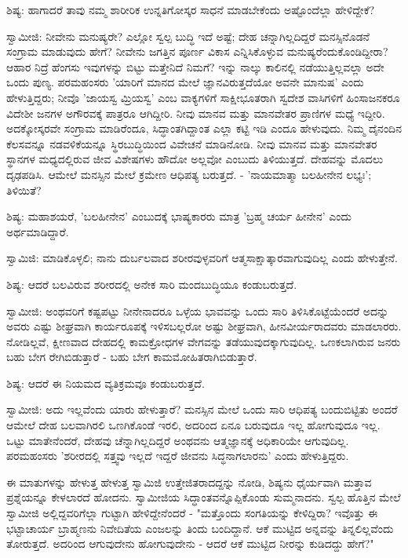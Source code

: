 ಶಿಷ್ಯ: ಹಾಗಾದರೆ ತಾವು ನಮ್ಮ ಶಾರೀರಿಕ ಉನ್ನತಿಗೋಸ್ಕರ ಸಾಧನೆ ಮಾಡಬೇಕೆಂದು ಅಷ್ಟೊಂದೆಲ್ಲಾ ಹೇಳಿದ್ದೇಕೆ?

ಸ್ವಾಮೀಜಿ: ನೀವೇನು ಮನುಷ್ಯರೇ? ಎಲ್ಲೋ ಸ್ವಲ್ಪ ಬುದ್ಧಿ ಇದೆ ಅಷ್ಟೆ; ದೇಹ ಚನ್ನಾಗಿಲ್ಲದಿದ್ದರೆ ಮನಸ್ಸಿನೊಡನೆ ಸಂಗ್ರಾಮ ಮಾಡುವುದು ಹೇಗೆ? ನೀವೇನು ಜಗತ್ತಿನ ಪೂರ್ಣ ವಿಕಾಸ ಎನ್ನಿಸಿಕೊಳ್ಳುವ ಮನುಷ್ಯರೆಂದುಕೊಂಡಿದ್ದೀರಾ? ಆಹಾರ ನಿದ್ರೆ ಹೆಂಗಸು ಇವುಗಳನ್ನು ಬಿಟ್ಟು ಮತ್ತೇನಿದೆ ನಿಮಗೆ? ಇನ್ನು ನಾಲ್ಕು ಕಾಲಿನಲ್ಲಿ ನಡೆಯುತ್ತಿಲ್ಲವಲ್ಲಾ ಅದೇ ಒಂದು ಪುಣ್ಯ. ಪರಮಹಂಸರು 'ಯಾರಿಗೆ ಮಾನದ ಮೇಲೆ ಜ್ಞಾನವಿರುತ್ತದೆಯೋ ಅವನೇ ಮಾನುಷ' ಎಂದು ಹೇಳುತ್ತಿದ್ದರು; ನೀವೊ 'ಜಾಯಸ್ವ ಮ್ರಿಯಸ್ವ' ಎಂಬ ವಾಕ್ಯಗಳಿಗೆ ಸಾಕ್ಷೀಭೂತರಾಗಿ ಸ್ವದೇಶ ವಾಸಿಗಳಿಗೆ ಹಿಂಸಾಜನಕರೂ ವಿದೇಶೀ ಜನಗಳ ಅಗೌರವಕ್ಕೆ ಪಾತ್ರರೂ ಆಗಿದ್ದೀರಿ. ನೀವು ಮಾನವ ಮತ್ತು ಮಾನವೇತರ ಪ್ರಾಣಿಗಳ ಮಧ್ಯೆ ಇದ್ದೀರಿ. ಅದಕ್ಕೋಸ್ಕರವೇ ಸಂಗ್ರಾಮ ಮಾಡಿರೆಂದೂ, ಸಿದ್ಧಾಂತಗಿದ್ದಾಂತ ಎಲ್ಲಾ ಕಟ್ಟಿ ಇಡಿ ಎಂದೂ ಹೇಳುವುದು. ನಿಮ್ಮ ದೈನಂದಿನ ಕೆಲಸವನ್ನೂ ನಡವಳಿಕೆಯನ್ನೂ ಸ್ಥಿರಬುದ್ಧಿಯಿಂದ ವಿವೇಚನೆ ಮಾಡಿನೋಡಿ. ನೀವು ಮಾನವ ಮತ್ತು ಮಾನವೇತರ ಸ್ಥಾನಗಳ ಮಧ್ಯದಲ್ಲಿರುವ ಜೀವ ವಿಶೇಷಗಳು ಹೌದೋ ಅಲ್ಲವೋ ಎಂಬುದು ತಿಳಿಯುತ್ತದೆ. ದೇಹವನ್ನು ಮೊದಲು ದೃಢಪಡಿಸಿ. ಆಮೇಲೆ ಮನಸ್ಸಿನ ಮೇಲೆ ಕ್ರಮೇಣ ಆಧಿಪತ್ಯ ಬರುತ್ತದೆ. - 'ನಾಯಮಾತ್ಮಾ ಬಲಹೀನೇನ ಲಭ್ಯಃ'; ತಿಳಿಯಿತೆ?

ಶಿಷ್ಯ: ಮಹಾಶಯರೆ, 'ಬಲಹೀನೇನ' ಎಂಬುದಕ್ಕೆ ಭಾಷ್ಯಕಾರರು ಮಾತ್ರ 'ಬ್ರಹ್ಮ ಚರ್ಯ ಹೀನೇನ' ಎಂದು ಅರ್ಥಮಾಡಿದ್ದಾರೆ.

ಸ್ವಾಮಿಜಿ: ಮಾಡಿಕೊಳ್ಳಲಿ; ನಾನು ದುರ್ಬಲವಾದ ಶರೀರವುಳ್ಳವರಿಗೆ ಆತ್ಮಸಾಕ್ಷಾತ್ಕಾರವಾಗುವುದಿಲ್ಲ ಎಂದು ಹೇಳುತ್ತೇನೆ.

ಶಿಷ್ಯ: ಆದರೆ ಬಲವಿರುವ ಶರೀರದಲ್ಲಿ ಅನೇಕ ಸಾರಿ ಮಂದಬುದ್ಧಿಯೂ ಕಂಡುಬರುತ್ತದೆ.

ಸ್ವಾಮೀಜಿ: ಅಂಥವರಿಗೆ ಕಷ್ಟಪಟ್ಟು ನೀನೇನಾದರೂ ಒಳ್ಳೆಯ ಭಾವವನ್ನು ಒಂದು ಸಾರಿ ತಿಳಿಸಿಕೊಟ್ಟೆಯೆಂದರೆ ಅದನ್ನು ಅವರು ಎಷ್ಟು ಶೀಘ್ರವಾಗಿ ಕಾರ್ಯರೂಪಕ್ಕೆ ಇಳಿಸಬಲ್ಲರೋ ಅಷ್ಟು ಶೀಘ್ರವಾಗಿ, ಹೀನವೀರ್ಯರಾದವರು ಮಾಡಲಾರರು. ನೋಡಿಲ್ಲವೆ, ಕ್ಷೀಣವಾದ ದೇಹದಲ್ಲಿ ಕಾಮಕ್ರೋಧಗಳ ವೇಗವನ್ನು ತಡೆಯುವುದಕ್ಕಾಗುವುದಿಲ್ಲ. ಒಣಕಲಾಗಿರುವ ಜನರು ಬಹು ಬೇಗ ರೇಗಿಬಿಡುತ್ತಾರೆ - ಬಹು ಬೇಗ ಕಾಮಮೋಹಿತರಾಗಿಬಿಡುತ್ತಾರೆ.

ಶಿಷ್ಯ: ಆದರೆ ಈ ನಿಯಮದ ವ್ಯತಿಕ್ರಮವೂ ಕಂಡುಬರುತ್ತದೆ.

ಸ್ವಾಮೀಜಿ: ಅದು ಇಲ್ಲವೆಂದು ಯಾರು ಹೇಳುತ್ತಾರೆ? ಮನಸ್ಸಿನ ಮೇಲೆ ಒಂದು ಸಾರಿ ಆಧಿಪತ್ಯ ಬಂದುಬಿಟ್ಟಿತು ಅಂದರೆ ಆಮೇಲೆ ದೇಹ ಬಲವಾಗಿರಲಿ ಒಣಗಿಕೊಂಡೆ ಇರಲಿ, ಅದರಿಂದ ಏನೂ ಬರುವುದೂ ಇಲ್ಲ ಹೋಗುವುದೂ ಇಲ್ಲ. ಒಟ್ಟು ಮಾತೇನೆಂದರೆ, ದೇಹವು ಚೆನ್ನಾಗಿಲ್ಲದಿದ್ದರೆ ಅಂಥವನು ಆತ್ಮಜ್ಞಾನಕ್ಕೆ ಅಧಿಕಾರಿಯೇ ಆಗುವುದಿಲ್ಲ. ಪರಮಹಂಸರು 'ಶರೀರದಲ್ಲಿ ಸತ್ತ್ವವು ಇಲ್ಲದೆ ಇದ್ದರೆ ಜೀವನು ಸಿದ್ಧನಾಗಲಾರನು' ಎಂದು ಹೇಳುತ್ತಿದ್ದರು.

ಈ ಮಾತುಗಳನ್ನು ಹೇಳುತ್ತ ಹೇಳುತ್ತ ಸ್ವಾಮಿಜಿ ಉತ್ತೇಜಿತರಾದದ್ದನ್ನು ನೋಡಿ, ಶಿಷ್ಯನು ಧೈರ್ಯವಾಗಿ ಮತ್ತಾವ ಪ್ರಶ್ನೆಯನ್ನೂ ಕೇಳಲಾರದೆ ಹೋದನು. ಸ್ವಾಮೀಜಿಯ ಸಿದ್ಧಾಂತವನ್ನೊಪ್ಪಿಕೊಂಡು ಸುಮ್ಮನಾದನು. ಸ್ವಲ್ಪ ಹೊತ್ತಿನ ಮೇಲೆ ಸ್ವಾಮೀಜಿ ಅಲ್ಲಿದ್ದವರಿಗೆಲ್ಲಾ ಗುಟ್ಟಾಗಿ ಹೇಳಿದ್ದೇನೆಂದರೆ - "ಮತ್ತೊಂದು ಸಂಗತಿಯನ್ನು ಕೇಳಿದ್ದಿರಾ? ಇವೊತ್ತು ಈ ಭಟ್ಟಾಚಾರ್ಯ ಬ್ರಾಹ್ಮಣನು ನಿವೇದಿತೆಯ ಎಂಜಲನ್ನು ತಿಂದು ಬಂದಿದ್ದಾನೆ. ಆಕೆ ಮುಟ್ಟಿದ ಅನ್ನವನ್ನು ತಿನ್ನಲಿಲ್ಲವೆಂದು ತೋರುತ್ತದೆ. ಅದರಿಂದ ಆಗುವುದೇನು ಹೋಗುವುದೇನು - ಆದರೆ ಆಕೆ ಮುಟ್ಟಿದ ನೀರನ್ನು ಕುಡಿದದ್ದು ಹೇಗೆ?"

